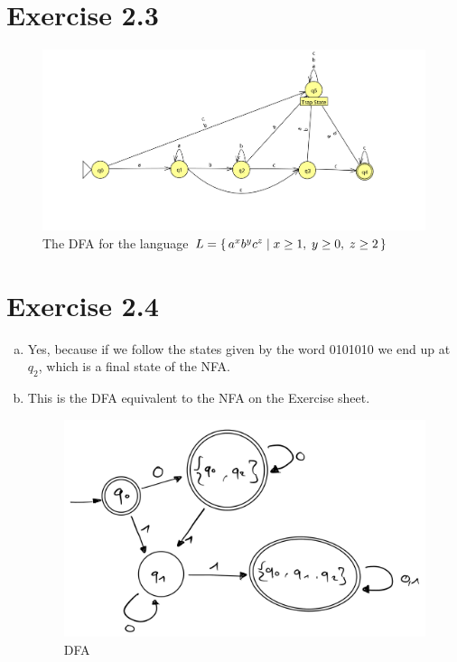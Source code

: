\documentclass{article} %
\newcommand{\homeworkNumber}{2}
\begin{document}
\section*{Exercise \homeworkNumber.3}
\begin{figure}[H]
	\includegraphics[width=\linewidth]{ex3.png}
	\centering
	\caption{The DFA for the language $L = \set{a^x b^y c^z \mid x \ge 1,\; y \ge 0,\; z \ge 2}$}
\end{figure}

\clearpage

\section*{Exercise \homeworkNumber.4}
\begin{enumerate}[(a)]
	\item
	Yes, because if we follow the states given by the word 0101010 we end up at
	$q_2$, which is a final state of the NFA.

	\item
	This is the DFA equivalent to the NFA on the Exercise sheet.
	\begin{figure}[H]
		\includegraphics[width=\linewidth]{ex4b.png}
		\centering
		\caption{DFA}
	\end{figure}
\end{enumerate}
\end{document}
